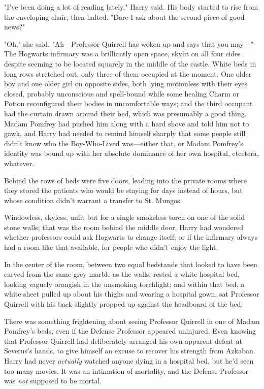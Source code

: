 "I've been doing a lot of reading lately," Harry said. His body started to rise 
from the enveloping chair, then halted. "Dare I ask about the second piece of 
good news?"

"Oh," she said. "Ah---Professor Quirrell has woken up and says that you may---"
\sbreak
The Hogwarts infirmary was a brilliantly open space, skylit on all four sides 
despite seeming to be located squarely in the middle of the castle. White beds 
in long rows stretched out, only three of them occupied at the moment. One 
older boy and one older girl on opposite sides, both lying motionless with 
their eyes closed, probably unconscious and spell-bound while some healing 
Charm or Potion reconfigured their bodies in uncomfortable ways; and the third 
occupant had the curtain drawn around their bed, which was presumably a good 
thing. Madam Pomfrey had pushed him along with a hard shove and told him not to 
gawk, and Harry had needed to remind himself sharply that some people still 
didn't know who the Boy-Who-Lived was---either that, or Madam Pomfrey's 
identity was bound up with her absolute dominance of her own hospital, 
etcetera, whatever.

Behind the rows of beds were five doors, leading into the private rooms where 
they stored the patients who would be staying for days instead of hours, but 
whose condition didn't warrant a transfer to St. Mungos.

Windowless, skyless, unlit but for a single smokeless torch on one of the solid 
stone walls; that was the room behind the middle door. Harry had wondered 
whether professors could ask Hogwarts to change itself; or if the infirmary 
always had a room like that available, for people who didn't enjoy the light.

In the center of the room, between two equal bedstands that looked to have been 
carved from the same grey marble as the walls, rested a white hospital bed, 
looking vaguely orangish in the unsmoking torchlight; and within that bed, a 
white sheet pulled up about his thighs and wearing a hospital gown, sat 
Professor Quirrell with his back slightly propped up against the headboard of 
the bed.

There was something frightening about seeing Professor Quirrell in one of Madam 
Pomfrey's beds, even if the Defense Professor appeared uninjured. Even knowing 
that Professor Quirrell had deliberately arranged his own apparent defeat at 
Severus's hands, to give himself an excuse to recover his strength from 
Azkaban. Harry had never \emph{actually} watched anyone dying in a hospital 
bed, but he'd seen too many movies. It was an intimation of mortality, and the 
Defense Professor was \emph{not} supposed to be mortal.

